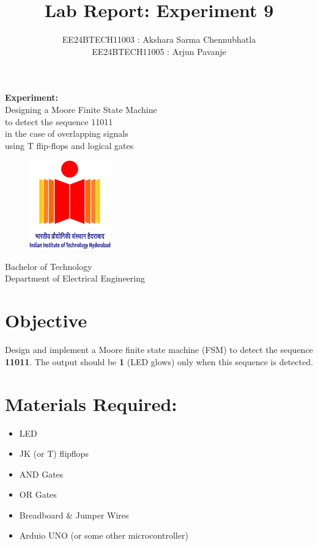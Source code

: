 \documentclass{article}
\title{\textbf{Lab Report: Experiment 9}}
\author{EE24BTECH11003 : Akshara Sarma Chennubhatla\\EE24BTECH11005 : Arjun Pavanje}
\begin{document}
\maketitle
\begin{center}
	\textbf{Experiment:}\\Designing a Moore Finite State Machine\\to detect the sequence 11011\\in the case of overlapping signals\\using T flip-flops and logical gates
\end{center}
\vspace{30pt}
\begin{figure}[h!]
	\centering
	\includegraphics[width = 100pt]{.logo/logo.png}\\
\end{figure}
\begin{center}
	Bachelor of Technology\\
	\vspace{10pt}
	Department of Electrical Engineering\\
\end{center}
\newpage
\section{Objective}
Design and implement a Moore finite state machine (FSM) to detect the sequence \textbf{11011}. The output should be \textbf{1} (LED glows) only when this sequence is detected.

\section{Materials Required:}

\begin{itemize}
    \item LED
    
    \item JK (or T) flipflops
    
    \item AND Gates 
    
    \item OR Gates
    
    \item Breadboard \& Jumper Wires
    
    \item Arduio UNO (or some other microcontroller)
    
\end{itemize}
\end{document}
